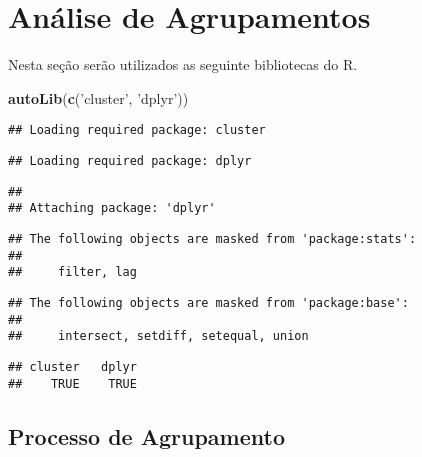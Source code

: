 \documentclass[]{book}
\newenvironment{Shaded}{\begin{snugshade}}{\end{snugshade}}
\newcommand{\KeywordTok}[1]{\textcolor[rgb]{0.13,0.29,0.53}{\textbf{{#1}}}}
\newcommand{\DataTypeTok}[1]{\textcolor[rgb]{0.13,0.29,0.53}{{#1}}}
\newcommand{\DecValTok}[1]{\textcolor[rgb]{0.00,0.00,0.81}{{#1}}}
\newcommand{\StringTok}[1]{\textcolor[rgb]{0.31,0.60,0.02}{{#1}}}
\newcommand{\NormalTok}[1]{{#1}}
\begin{document}
\chapter{Análise de Agrupamentos}\label{CA}

Nesta seção serão utilizados as seguinte bibliotecas do R.

\begin{Shaded}
\begin{Highlighting}[]
\KeywordTok{autoLib}\NormalTok{(}\KeywordTok{c}\NormalTok{(}\StringTok{'cluster'}\NormalTok{, }\StringTok{'dplyr'}\NormalTok{))}
\end{Highlighting}
\end{Shaded}

\begin{verbatim}
## Loading required package: cluster
\end{verbatim}

\begin{verbatim}
## Loading required package: dplyr
\end{verbatim}

\begin{verbatim}
## 
## Attaching package: 'dplyr'
\end{verbatim}

\begin{verbatim}
## The following objects are masked from 'package:stats':
## 
##     filter, lag
\end{verbatim}

\begin{verbatim}
## The following objects are masked from 'package:base':
## 
##     intersect, setdiff, setequal, union
\end{verbatim}

\begin{verbatim}
## cluster   dplyr 
##    TRUE    TRUE
\end{verbatim}

\begin{Shaded}
\end{Shaded}

\section{Processo de Agrupamento}\label{AAprocess}
\end{document}
